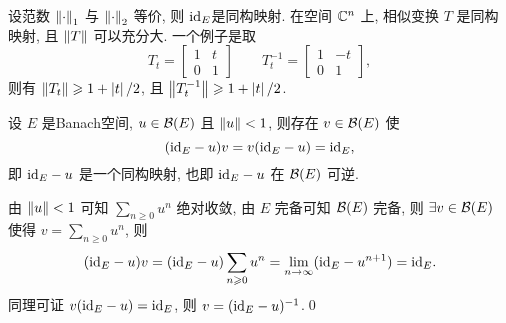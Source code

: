     \begin{Remark}
        设范数 $ \left\| \cdot \right\|_{1} $ 与 $ \left\| \cdot \right\|_{2} $ 等价, 则 $ \mathrm{id}_{E} $是同构映射. 在空间 $ \mathbb{C}^{n} $ 上, 相似变换 $ T $ 是同构映射, 且 $ \left\| T \right\| $ 可以充分大. 一个例子是取
        \[
            T_{t}=\begin{bmatrix}
                1 & t\\
                0 & 1
            \end{bmatrix}
            \qquad
            T_{t}^{-1}=\begin{bmatrix}
                1 & -t \\
                0 & 1
            \end{bmatrix},
        \]
        则有 $ \left\| T_{t} \right\|\geqslant1+\left| t \right| /2 $, 且 $ \left\| T_{t}^{-1} \right\|\geqslant 1+\left| t \right| /2 $.
    \end{Remark}

    \begin{Theorem}
         设 $ E $ 是Banach空间,  $ u\in\mathcal{B}(E) $ 且 $ \left\| u \right\|<1 $, 则存在 $ v\in\mathcal{B}(E) $ 使
         \[
             (\mathrm{id}_{E}-u)v=v(\mathrm{id}_{E}-u)=\mathrm{id}_{E},
         \]
         即 $ \mathrm{id}_{E}-u $ 是一个同构映射, 也即 $ \mathrm{id}_{E}-u $ 在 $ \mathcal{B}(E) $ 可逆.
    \end{Theorem}
    \begin{Proof}
        由 $ \left\| u \right\|<1 $ 可知 $ \sum\limits_{n\geqslant0}u^n $ 绝对收敛, 由 $ E $ 完备可知 $ \mathcal{B}
        (E) $ 完备, 则 $ \exists v\in\mathcal{B}(E) $ 使得 $ v=\sum\limits_{n\geqslant 0}u^n $, 则
        \[
            (\mathrm{id}_E-u)v=(\mathrm{id}_E-u)\sum_{n\geqslant 0}u^n=\lim_{n\to\infty}(\mathrm{id}_E-u^{n+1})=\mathrm{id}_E.
        \]
        同理可证 $ v(\mathrm{id}_E-u)=\mathrm{id}_E $, 则 $ v=(\mathrm{id}_E-u)^{-1} $.\qed
    \end{Proof}


